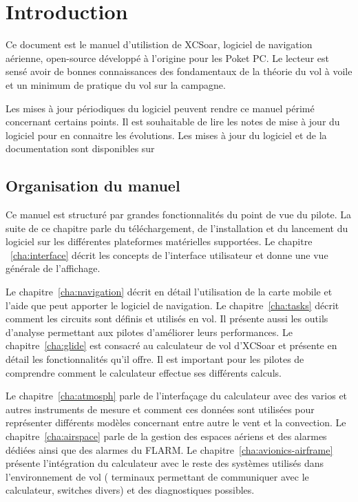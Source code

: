 \chapter{Introduction}\label{cha:introduction}
Ce document est le manuel d'utilistion de XCSoar, logiciel de navigation aérienne, open-source développé à l'origine pour les Poket PC. Le lecteur est sensé avoir de bonnes connaissances des fondamentaux de la théorie  du vol à voile et un minimum de pratique du vol sur la campagne.

Les mises à jour périodiques du logiciel peuvent rendre ce manuel périmé concernant certains points. Il est souhaitable de lire les notes de mise à jour du logiciel pour en connaitre les évolutions. Les mises à jour du logiciel et de la documentation sont disponibles sur
\begin{quote}
\end{quote}

\section{Organisation du manuel}

Ce manuel est structuré par grandes fonctionnalités du point de vue du pilote. La suite de ce chapitre parle du téléchargement, de l'installation et du lancement du logiciel sur les différentes plateformes matérielles supportées. Le chapitre ~\ref{cha:interface} décrit les concepts de l'interface utilisateur et donne une vue générale de l'affichage.

Le chapitre~\ref{cha:navigation} décrit en détail l'utilisation de la carte mobile et l'aide que peut apporter le logiciel de navigation. Le chapitre~\ref{cha:tasks} décrit comment les circuits sont définis et utilisés en vol. Il présente aussi les outils d'analyse permettant aux pilotes d'améliorer leurs performances. Le chapitre~\ref{cha:glide}  est consacré au calculateur de vol d'XCSoar et présente en détail les fonctionnalités qu'il offre. Il est important pour les pilotes de comprendre comment le calculateur effectue ses différents calculs.

Le chapitre~\ref{cha:atmosph} parle de l'interfaçage du calculateur avec des varios et autres instruments de mesure et comment ces données sont utilisées pour représenter différents modèles concernant entre autre le vent et la convection. Le chapitre~\ref{cha:airspace} parle de la gestion des espaces aériens et des alarmes dédiées ainsi que des alarmes du FLARM. Le chapitre~\ref{cha:avionics-airframe} présente l'intégration du calculateur avec le reste des systèmes utilisés dans l'environnement de vol ( terminaux permettant de communiquer avec le calculateur, switches divers) et des diagnostiques possibles.

